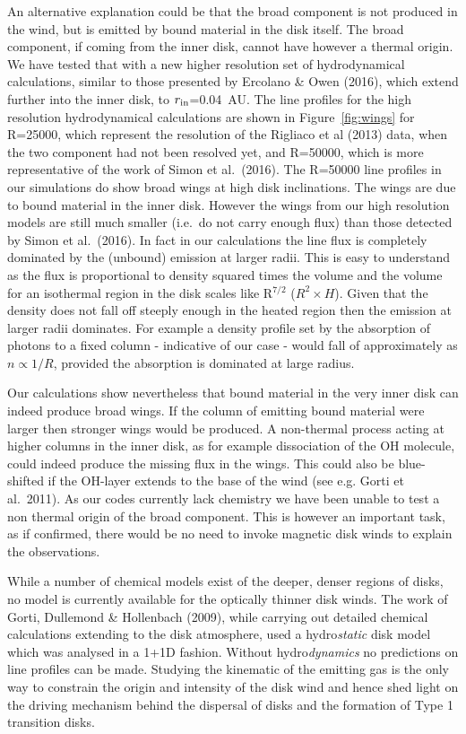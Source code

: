 \documentclass[10pt,fleqn,twoside]{article}
\begin{document}
An alternative explanation could be that the broad
component is not produced in the wind, but is emitted by bound
material in the disk itself. The broad component, if coming from the
inner disk, cannot have however a thermal origin. We have tested that
with a new higher resolution set of hydrodynamical calculations,
similar to those presented by Ercolano \& Owen (2016), which
extend further into the inner disk, to $r_{\rm in}$=0.04~AU. The line
profiles for the high resolution hydrodynamical calculations are shown
in Figure~\ref{fig:wings} for R=25000, which represent the resolution of the
Rigliaco et al (2013) data, when the two component had not been
resolved yet, and R=50000, which is more representative
of the work of Simon et al.\ (2016). The
R=50000 line profiles in our simulations do show broad wings at high disk
inclinations. The wings are due to bound material in the inner
disk. However the wings from our high resolution models are still much
smaller (i.e.\ do not carry enough flux) than those detected by
Simon et al.\ (2016). In fact in our calculations the line flux
is completely dominated by the (unbound) emission at larger
radii. This is easy to understand as the flux is proportional to
density squared times the volume and the volume for an isothermal
region in the disk scales like R$^{7/2}$ ($R^2\times H$). Given that
the density does not fall off steeply enough in the heated region then
the emission at larger radii dominates. For 
example a density profile set by the absorption of photons to a fixed
column - indicative of our case - would fall of approximately as
$n\propto1/R$, provided the absorption is dominated at large radius.

Our calculations show nevertheless that bound material in the very
inner disk can indeed produce broad wings. If the column of emitting
bound material were larger then stronger wings would be produced. A
non-thermal process acting at higher columns in the inner disk, as for
example dissociation of the OH molecule, could
indeed produce the missing flux in the wings. This could also be
blue-shifted if the OH-layer extends to the base of the wind (see e.g.
Gorti et al.\ 2011). As our codes currently
lack chemistry we have been unable to test a non thermal
origin of the broad component. This is however an important task, as
if confirmed, there would be no need to invoke magnetic disk winds to
explain the observations.  

 While a number of chemical models exist
of the deeper, denser regions of disks, no model is currently
available for the optically thinner disk winds. The work of Gorti, Dullemond \&
Hollenbach (2009), while carrying out detailed chemical calculations
extending to the disk atmosphere, used a hydro{\it static} disk model which
was analysed in a 1+1D fashion. Without hydro{\it dynamics} no predictions
on line profiles can be made.  
Studying the kinematic of the emitting gas is the only way to
constrain the origin and intensity of the disk wind and hence shed
light on the driving mechanism behind the dispersal of disks and the
formation of Type 1 transition disks. 
\end{document}
